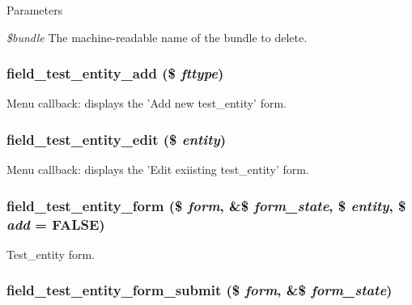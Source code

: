 \begin{DoxyParams}{Parameters}
\item[{\em \$bundle}]The machine-\/readable name of the bundle to delete. \end{DoxyParams}
\hypertarget{field__test_8entity_8inc_ab180fd4929a5b01119359b9dcf6da27e}{
\subsubsection[{field\_\-test\_\-entity\_\-add}]{\setlength{\rightskip}{0pt plus 5cm}field\_\-test\_\-entity\_\-add (\$ {\em fttype})}}
\label{field__test_8entity_8inc_ab180fd4929a5b01119359b9dcf6da27e}
Menu callback: displays the 'Add new test\_\-entity' form. \hypertarget{field__test_8entity_8inc_acb9406030a9bf8851f1de5b8169996ca}{
\subsubsection[{field\_\-test\_\-entity\_\-edit}]{\setlength{\rightskip}{0pt plus 5cm}field\_\-test\_\-entity\_\-edit (\$ {\em entity})}}
\label{field__test_8entity_8inc_acb9406030a9bf8851f1de5b8169996ca}
Menu callback: displays the 'Edit exiisting test\_\-entity' form. \hypertarget{field__test_8entity_8inc_a85a2c69ad395d255d448d7f3d72ba9f3}{
\subsubsection[{field\_\-test\_\-entity\_\-form}]{\setlength{\rightskip}{0pt plus 5cm}field\_\-test\_\-entity\_\-form (\$ {\em form}, \/  \&\$ {\em form\_\-state}, \/  \$ {\em entity}, \/  \$ {\em add} = {\ttfamily FALSE})}}
\label{field__test_8entity_8inc_a85a2c69ad395d255d448d7f3d72ba9f3}
Test\_\-entity form. \hypertarget{field__test_8entity_8inc_afd81eae9834f97ca915796f2e9240ef5}{
\subsubsection[{field\_\-test\_\-entity\_\-form\_\-submit}]{\setlength{\rightskip}{0pt plus 5cm}field\_\-test\_\-entity\_\-form\_\-submit (\$ {\em form}, \/  \&\$ {\em form\_\-state})}}
